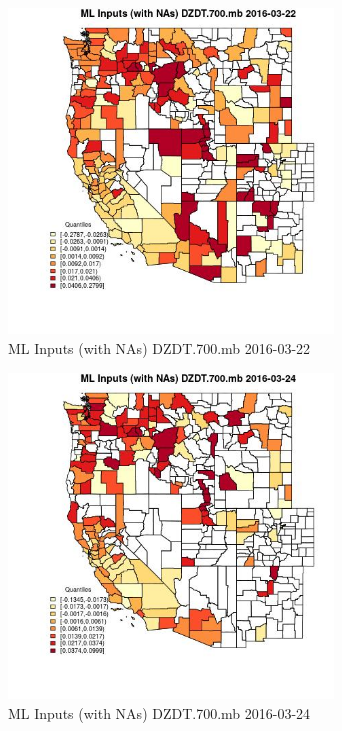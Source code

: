 \begin{figure} 
\centering  
\includegraphics[width=0.77\textwidth]{Code_Outputs/Report_ML_input_PM25_Step4_part_e_de_duplicated_aveswNAs_CountyDZDT700mbMean2016-03-22_2016-03-22.jpg} 
\caption{\label{fig:Report_ML_input_PM25_Step4_part_e_de_duplicated_aveswNAsCountyDZDT700mbMean2016-03-22_2016-03-22}ML Inputs (with NAs) DZDT.700.mb 2016-03-22} 
\end{figure} 
 

\begin{figure} 
\centering  
\includegraphics[width=0.77\textwidth]{Code_Outputs/Report_ML_input_PM25_Step4_part_e_de_duplicated_aveswNAs_CountyDZDT700mbMean2016-03-24_2016-03-24.jpg} 
\caption{\label{fig:Report_ML_input_PM25_Step4_part_e_de_duplicated_aveswNAsCountyDZDT700mbMean2016-03-24_2016-03-24}ML Inputs (with NAs) DZDT.700.mb 2016-03-24} 
\end{figure} 
 


